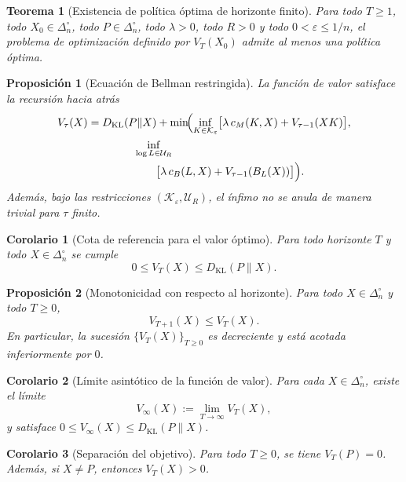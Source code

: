 \documentclass[12pt]{article}
\newtheorem{proposicion}{Proposición}[section]
\newtheorem{teorema}{Teorema}[section]
\newtheorem{corolario}{Corolario}[section]
\begin{document}
\begin{teorema}[Existencia de política óptima de horizonte finito]\label{teo:existencia-politica-optima}
Para todo $T\ge 1$, todo $X_0\in\Delta_n^\circ$, todo $P\in\Delta_n^\circ$,
todo $\lambda>0$, todo $R>0$ y todo $0<\varepsilon\le 1/n$, el problema de
optimización definido por $V_T(X_0)$ admite al menos una política óptima.
\end{teorema}

\begin{proposicion}[Ecuación de Bellman restringida]\label{prop:bellman}
La función de valor satisface la recursión hacia atrás
\[
\begin{aligned}
V_\tau(X)
&=
D_{\mathrm{KL}}(P\|X)
+\min\!\Bigl(
\inf_{K\in\mathcal K_\varepsilon}
\bigl[\lambda\,c_M(K,X)+V_{\tau-1}(XK)\bigr],\\
&\hspace{4.2em}
\inf_{\log L\in\mathcal U_R}
\\
&\hspace{6.2em}
\bigl[\lambda\,c_B(L,X)+V_{\tau-1}(B_L(X))\bigr]
\Bigr).
\end{aligned}
\]
Además, bajo las restricciones $(\mathcal K_\varepsilon,\mathcal U_R)$, el
ínfimo no se anula de manera trivial para $\tau$ finito.
\end{proposicion}

\begin{corolario}[Cota de referencia para el valor óptimo]\label{cor:cota-referencia}
Para todo horizonte $T$ y todo $X\in\Delta_n^\circ$ se cumple
\[
0\le V_T(X)\le D_{\mathrm{KL}}(P\|X).
\]
\end{corolario}

\begin{proposicion}[Monotonicidad con respecto al horizonte]\label{prop:monotonia-horizonte}
Para todo $X\in\Delta_n^\circ$ y todo $T\ge 0$,
\[
V_{T+1}(X)\le V_T(X).
\]
En particular, la sucesión $\{V_T(X)\}_{T\ge 0}$ es decreciente y está
acotada inferiormente por $0$.
\end{proposicion}

\begin{corolario}[Límite asintótico de la función de valor]\label{cor:valor-limite}
Para cada $X\in\Delta_n^\circ$, existe el límite
\[
V_\infty(X):=\lim_{T\to\infty}V_T(X),
\]
y satisface $0\le V_\infty(X)\le D_{\mathrm{KL}}(P\|X)$.
\end{corolario}

\begin{corolario}[Separación del objetivo]\label{cor:valor-cero}
Para todo $T\ge 0$, se tiene $V_T(P)=0$. Además, si $X\neq P$, entonces
$V_T(X)>0$.
\end{corolario}
\end{document}
